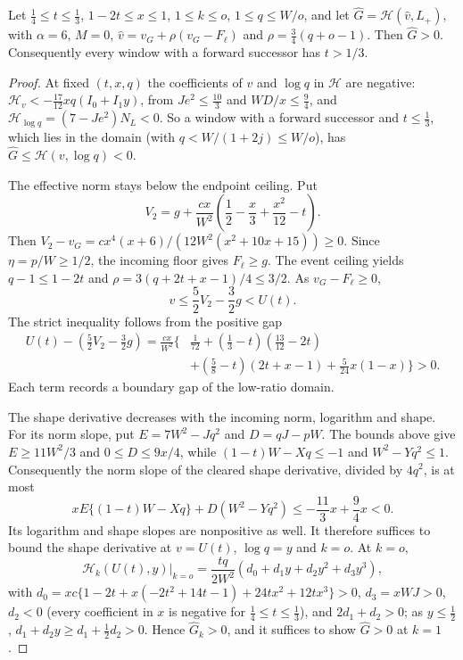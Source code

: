 \begin{lemma}\label{lem:m2-low-ratio}
Let $\frac14\le t\le\frac13$, $1-2t\le x\le1$, $1\le k\le o$, $1\le q\le W/o$, and let
$\widehat G=\mathcal H(\hat v,L_+)$, with $\alpha=6$, $M=0$, $\hat v=v_G+\rho(v_G-F_\ell)$ and
$\rho=\frac34(q+o-1)$. Then $\widehat G>0$. Consequently every window with a forward successor has
$t>1/3$.
\end{lemma}

\begin{proof}
At fixed $(t,x,q)$ the coefficients of $v$ and $\log q$ in $\mathcal H$ are negative:
$\mathcal H_v<-\frac{17}{12}xq(I_0+I_1y)$, from $Je^2\le\frac{10}3$ and $WD/x\le\frac94$, and
$\mathcal H_{\log q}=(7-Je^2)N_L<0$. So a window with a forward successor and $t\le\frac13$, which
lies in the domain (with $q<W/(1+2j)\le W/o$), has $\widehat G\le\mathcal H(v,\log q)<0$.

The effective norm stays below the endpoint ceiling. Put
\[
 V_2=g+\frac{cx}{W^2}\left(\frac12-\frac x3+\frac{x^2}{12}-t\right).
\]
Then $V_2-v_G=cx^4(x+6)/(12W^2(x^2+10x+15))\ge0$.
Since $\eta=p/W\ge1/2$, the incoming floor gives $F_\ell\ge g$.
The event ceiling yields $q-1\le1-2t$ and
$\rho=3(q+2t+x-1)/4\le3/2$. As $v_G-F_\ell\ge0$,
\[
 \hat v\le\frac52V_2-\frac32g<U(t).
\]
The strict inequality follows from the positive gap
\begin{align*}
 U(t)-\left(\frac52V_2-\frac32g\right)
 =\frac{cx}{W^2}\bigl\{&\frac1{72}
 +(\tfrac13-t)(\tfrac{13}{12}-2t)\\
 &+(\tfrac58-t)(2t+x-1)+\tfrac5{24}x(1-x)\bigr\}>0.
\end{align*}
Each term records a boundary gap of the low-ratio domain.

The shape derivative decreases with the incoming norm, logarithm and shape.
For its norm slope, put $E=7W^2-Jq^2$ and $D=qJ-pW$.
The bounds above give $E\ge11W^2/3$ and $0\le D\le9x/4$, while
$(1-t)W-Xq\le-1$ and $W^2-Yq^2\le1$.
Consequently the norm slope of the cleared shape derivative, divided by $4q^2$, is at most
\[
 xE\{(1-t)W-Xq\}+D(W^2-Yq^2)
 \le-\frac{11}3x+\frac94x<0.
\]
Its logarithm and shape slopes are nonpositive as well.
It therefore suffices to bound the shape derivative at $v=U(t)$, $\log q=y$ and $k=o$.
At $k=o$,
\[
\mathcal H_k(U(t),y)\big|_{k=o}=\frac{tq}{2W^2}(d_0+d_1y+d_2y^2+d_3y^3),
\]
with $d_0=xc\{1-2t+x(-2t^2+14t-1)+24tx^2+12tx^3\}>0$, $d_3=xWJ>0$, $d_2<0$ (every coefficient
in $x$ is negative for $\frac14\le t\le\frac13$), and $2d_1+d_2>0$; as $y\le\frac12$,
$d_1+d_2y\ge d_1+\frac12d_2>0$. Hence $\widehat G_k>0$, and it suffices to show $\widehat G>0$ at $k=1$.


\end{proof}
